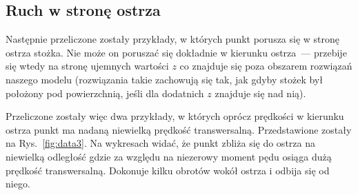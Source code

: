 \documentclass[a4paper; 12pt]{article}
\begin{document}
\subsection{Ruch w stronę ostrza}
Następnie przeliczone zostały przykłady, w których punkt porusza się w stronę
ostrza stożka.
Nie może on poruszać się dokładnie w kierunku ostrza~--- przebije się wtedy
na stronę ujemnych wartości $z$ co znajduje się poza obszarem rozwiązań naszego
modelu (rozwiązania takie zachowują się tak, jak gdyby stożek był położony pod
powierzchnią, jeśli dla dodatnich $z$ znajduje się nad nią).

Przeliczone zostały więc dwa przykłady, w których oprócz prędkości w kierunku
ostrza punkt ma nadaną niewielką prędkość transwersalną.
Przedstawione zostały na Rys.~\ref{fig:data3}.
Na wykresach widać, że punkt zbliża się do ostrza na niewielką odległość gdzie
za względu na niezerowy moment pędu osiąga dużą prędkość transwersalną.
Dokonuje kilku obrotów wokół ostrza i odbija się od niego.
\end{document}
